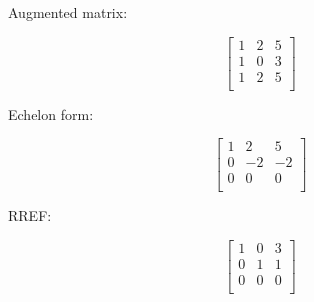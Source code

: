 \begin{paracol}{3}
\switchcolumn

Augmented matrix:

$$
\left[\begin{array}{cc|c}
    1 & 2 & 5 \\
    1 & 0 & 3 \\
    1 & 2 & 5 \\
\end{array}\right]
$$

\switchcolumn

Echelon form:

$$
\left[\begin{array}{cc|c}
    1 & 2 & 5 \\
    0 & -2 & -2 \\
    0 & 0 & 0 \\
\end{array}\right]
$$

\switchcolumn

RREF:

$$
\left[\begin{array}{cc|c}
    1 & 0 & 3 \\
    0 & 1 & 1 \\
    0 & 0 & 0 \\
\end{array}\right]
$$

\end{paracol}

